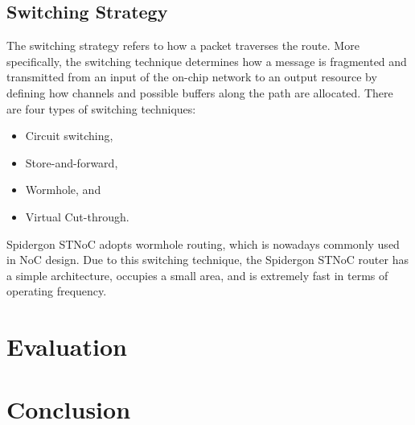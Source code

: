 \subsection{Switching Strategy}\label{S:switching}

The switching strategy refers to how a packet traverses the route. 
More specifically, the switching technique determines how a message is fragmented and transmitted from an input of the on-chip network to an output resource by defining how channels and possible buffers along the path are allocated. 
There are four types of switching techniques:
\begin{itemize}
\item Circuit switching,
\item Store-and-forward,
\item Wormhole, and 
\item Virtual Cut-through.
\end{itemize}

Spidergon STNoC adopts wormhole routing, which is nowadays commonly used in NoC design. 
Due to this switching technique, the Spidergon STNoC router has a simple architecture, occupies a small area, and is extremely fast in terms of operating frequency.

\section{Evaluation}\label{C:evaluation}

\section{Conclusion}\label{S:conclusion}






